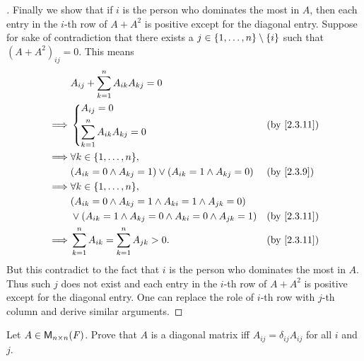 \begin{proof}[]
  Finally we show that if \(i\) is the person who dominates the most in \(A\), then each entry in the \(i\)-th row of \(A + A^2\) is positive except for the diagonal entry.
  Suppose for sake of contradiction that there exists a \(j \in \left\lbrace1, \dots, n\right\rbrace \setminus \left\lbrace i\right\rbrace\) such that \((A + A^2)_{i j} = 0\).
  This means
  \begin{align*}
             & A_{i j} + \sum_{k = 1}^n A_{i k} A_{k j} = 0                                                            \\
    \implies & \begin{dcases}
                 A_{i j} = 0 \\
                 \sum_{k = 1}^n A_{i k} A_{k j} = 0
               \end{dcases}                                       &  & \text{(by \cref{2.3.11})}                       \\
    \implies & \forall k \in \set{1, \dots, n},                                                                        \\
             & (A_{i k} = 0 \land A_{k j} = 1) \lor (A_{i k} = 1 \land A_{k j} = 0)     &  & \text{(by \cref{2.3.9})}  \\
    \implies & \forall k \in \set{1, \dots, n},                                                                        \\
             & (A_{i k} = 0 \land A_{k j} = 1 \land A_{k i} = 1 \land A_{j k} = 0)                                     \\
             & \lor (A_{i k} = 1 \land A_{k j} = 0 \land A_{k i} = 0 \land A_{j k} = 1) &  & \text{(by \cref{2.3.11})} \\
    \implies & \sum_{k = 1}^n A_{i k} = \sum_{k = 1}^n A_{j k} > 0.                     &  & \text{(by \cref{2.3.11})}
  \end{align*}
  But this contradict to the fact that \(i\) is the person who dominates the most in \(A\).
  Thus such \(j\) does not exist and each entry in the \(i\)-th row of \(A + A^2\) is positive except for the diagonal entry.
  One can replace the role of \(i\)-th row with \(j\)-th column and derive similar arguments.
\end{proof}

\exercisesection

\setcounter{ex}{9}
\begin{ex}\label{ex:2.3.10}
  Let \(A \in \mathsf{M}_{{n} \times n}({\mathit{F}})\).
  Prove that \(A\) is a diagonal matrix iff \(A_{i j} = \delta_{i j} A_{i j}\) for all \(i\) and \(j\).
\end{ex}

